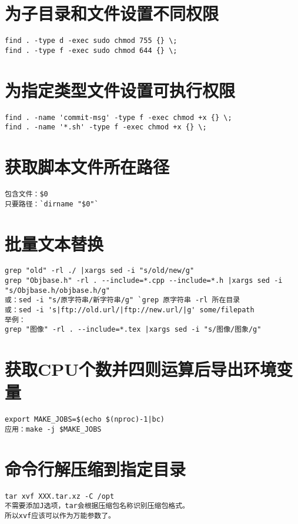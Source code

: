 \documentclass[a4paper,fontset=fandol,zihao=-4,linespread=1.2]{ctexbook}
\begin{document}
\section{为子目录和文件设置不同权限}
\begin{lstlisting}
find . -type d -exec sudo chmod 755 {} \;
find . -type f -exec sudo chmod 644 {} \;
\end{lstlisting}

\section{为指定类型文件设置可执行权限}
\begin{lstlisting}
find . -name 'commit-msg' -type f -exec chmod +x {} \;
find . -name '*.sh' -type f -exec chmod +x {} \;
\end{lstlisting}

\section{获取脚本文件所在路径}
\begin{lstlisting}
包含文件：$0
只要路径：`dirname "$0"`
\end{lstlisting}

\section{批量文本替换}
\begin{lstlisting}
grep "old" -rl ./ |xargs sed -i "s/old/new/g"
grep "Objbase.h" -rl . --include=*.cpp --include=*.h |xargs sed -i "s/Objbase.h/objbase.h/g"
或：sed -i "s/原字符串/新字符串/g" `grep 原字符串 -rl 所在目录
或：sed -i 's|ftp://old.url/|ftp://new.url/|g' some/filepath
举例：
grep "图像" -rl . --include=*.tex |xargs sed -i "s/图像/图象/g"
\end{lstlisting}

\section{获取CPU个数并四则运算后导出环境变量}
\begin{lstlisting}
export MAKE_JOBS=$(echo $(nproc)-1|bc)
应用：make -j $MAKE_JOBS
\end{lstlisting}

\section{命令行解压缩到指定目录}
\begin{lstlisting}
tar xvf XXX.tar.xz -C /opt
不需要添加J选项，tar会根据压缩包名称识别压缩包格式。
所以xvf应该可以作为万能参数了。
\end{lstlisting}
\end{document}

